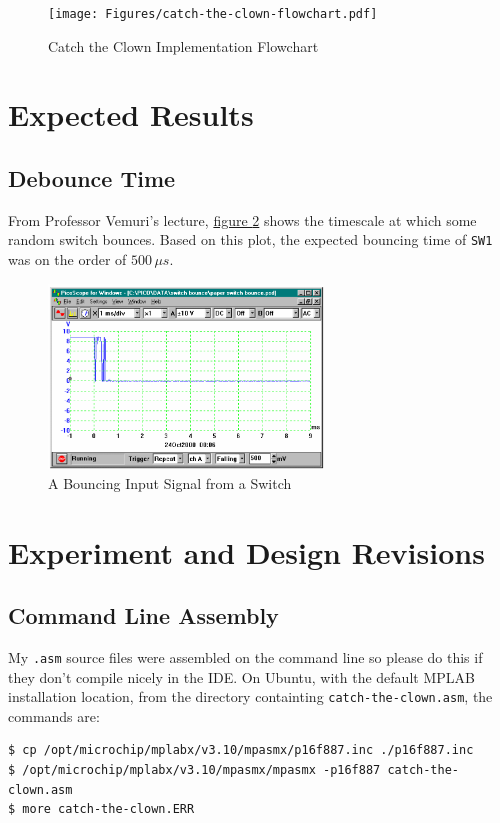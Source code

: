 \documentclass[11pt]{article}
\begin{document}
\begin{figure}[h!]
	\centering
	\texttt{[image: Figures/catch-the-clown-flowchart.pdf]}
	\caption{Catch the Clown Implementation Flowchart}
	\label{catch-the-clown-flowchart}
\end{figure}

\clearpage
\section{Expected Results}

\subsection{Debounce Time}

From Professor Vemuri's lecture,
\hyperref[debounce-handout-time-graph]{figure \ref{debounce-handout-time-graph}}
shows the timescale at which some random switch bounces.
Based on this plot, the expected bouncing time of \texttt{SW1}
was on the order of $500\, \mu s$.

\begin{figure}[h!]
	\centering
	\includegraphics[width=0.65\textwidth]{Figures/debounce-handout-time-graph.pdf}
	\caption{A Bouncing Input Signal from a Switch}
	\label{debounce-handout-time-graph}
\end{figure}

\section{Experiment and Design Revisions}

\subsection{Command Line Assembly}

My \texttt{.asm} source files were assembled on the command line so
please do this if they don't compile nicely in the IDE.
On Ubuntu, with the default MPLAB installation location, 
from the directory containting \texttt{catch-the-clown.asm}, the commands are:
\begin{verbatim}
$ cp /opt/microchip/mplabx/v3.10/mpasmx/p16f887.inc ./p16f887.inc
$ /opt/microchip/mplabx/v3.10/mpasmx/mpasmx -p16f887 catch-the-clown.asm
$ more catch-the-clown.ERR
\end{verbatim}
\end{document}
